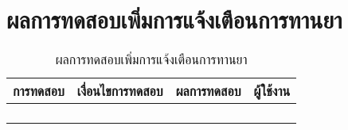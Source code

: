 \section{ผลการทดสอบเพิ่มการแจ้งเตือนการทานยา}
\begin{table}[H]
	\caption{ผลการทดสอบเพิ่มการแจ้งเตือนการทานยา}
    \centering	
	\label{tab:test28}
    \begin{tabular}{ | p{4cm} | p{4cm} | p{4cm} | p{2cm} | }
		\hline
	\multicolumn{1}{|c|}{การทดสอบ} & \multicolumn{1}{c|}{เงื่อนไขการทดสอบ} & \multicolumn{1}{c|}{ผลการทดสอบ} & \multicolumn{1}{c|}{ผู้ใช้งาน}                             \\ \hline
	\setstretch{1.0}{ทดสอบเพิ่มการแจ้งเตือนการทานยา}
	& \setstretch{1.0}{ผู้ใช้เลือกประเภท กรอกชื่อยา กรอกจำนวน เลือกช่วงเวลา และกดบันทึกข้อมูลยา}
	& \setstretch{1.0}{ระบบจะบันทึกข้อมูล และแสดงข้อความ “บันทึกข้อมูลยาเรียบร้อยแล้ว”} 
	&\setstretch{1.0}{\begin{flushleft}ผู้ใช้งาน\end{flushleft}} \\ \cline{2-3} 
	& \setstretch{1.0}{ผู้ใช้ไม่กรอกข้อมูล และกดบันทึกข้อมูลยา}
	& \setstretch{1.0}{ระบบจะแสดงข้อความ “กรอกข้อมูลให้ถูกต้อง” } 
	&\setstretch{1.0}{}\\ \cline{2-3} 
	& \setstretch{1.0}{ผู้ใช้เลือกตั้งเวลาแจ้งเตือน}
	& \setstretch{1.0}{ระบบจะแสดงรูปแบบเวลาแบบ 24 Hrs } 
	&\setstretch{1.0}{}\\ \cline{2-3} 
	& \setstretch{1.0}{ผู้ใช้เลือกประเภท}
	& \setstretch{1.0}{ระบบจะให้เลือกได้ 2 ประเภท ได้แก่ สำหรับรับประทาน และ สำหรับฉีด } 
	&\setstretch{1.0}{}\\ \cline{2-3} 
    \end{tabular}
\end{table}

